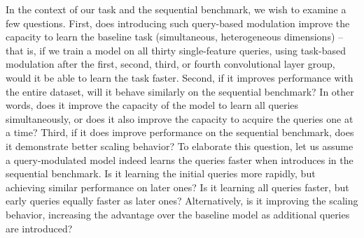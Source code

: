 In the context of our task and the sequential benchmark, we wish to examine a few questions. First, does introducing such query-based modulation improve the capacity to learn the baseline task (simultaneous, heterogeneous dimensions) -- that is, if we train a model on all thirty single-feature queries, using task-based modulation after the first, second, third, or fourth convolutional layer group, would it be able to learn the task faster. Second, if it improves performance with the entire dataset, will it behave similarly on the sequential benchmark? In other words, does it improve the capacity of the model to learn all queries simultaneously, or does it also improve the capacity to acquire the queries one at a time? Third, if it does improve performance on the sequential benchmark, does it demonstrate better scaling behavior? To elaborate this question, let us assume a query-modulated model indeed learns the queries faster when introduces in the sequential benchmark. Is it learning the initial queries more rapidly, but achieving similar performance on later ones? Is it learning all queries faster, but early queries equally faster as later ones? Alternatively, is it improving the scaling behavior, increasing the advantage over the baseline model as additional queries are introduced?
